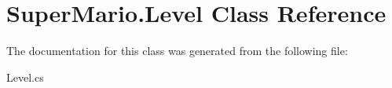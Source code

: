 \hypertarget{class_super_mario_1_1_level}{}\section{Super\+Mario.\+Level Class Reference}
\label{class_super_mario_1_1_level}


The documentation for this class was generated from the following file\+:\begin{DoxyCompactItemize}
\item 
Level.\+cs\end{DoxyCompactItemize}
